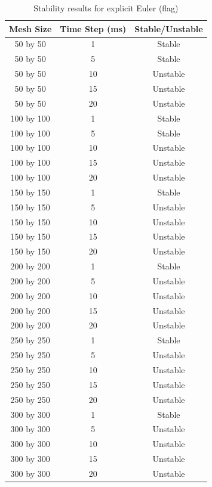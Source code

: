 \begin{table}[tp]
   \begin{minipage}{\textwidth}
      \begin{center}
         \begin{tabular}{c|c|c}
           Mesh Size & Time Step (ms) & Stable/Unstable\\
           \hline
           50 by 50 & 1 & Stable\\
           50 by 50 & 5 & Stable\\
           50 by 50 & 10 & Unstable\\
           50 by 50 & 15 & Unstable\\
           50 by 50 & 20 & Unstable\\
           100 by 100 & 1 & Stable\\
           100 by 100 & 5 & Stable\\
           100 by 100 & 10 & Unstable\\
           100 by 100 & 15 & Unstable\\
           100 by 100 & 20 & Unstable\\           
           150 by 150 & 1 & Stable\\
           150 by 150 & 5 & Unstable\\
           150 by 150 & 10 & Unstable\\
           150 by 150 & 15 & Unstable\\
           150 by 150 & 20 & Unstable\\           
           200 by 200 & 1 & Stable\\
           200 by 200 & 5 & Unstable\\
           200 by 200 & 10 & Unstable\\
           200 by 200 & 15 & Unstable\\
           200 by 200 & 20 & Unstable\\           
           250 by 250 & 1 & Stable\\
           250 by 250 & 5 & Unstable\\
           250 by 250 & 10 & Unstable\\
           250 by 250 & 15 & Unstable\\
           250 by 250 & 20 & Unstable\\           
           300 by 300 & 1 & Stable\\
           300 by 300 & 5 & Unstable\\
           300 by 300 & 10 & Unstable\\
           300 by 300 & 15 & Unstable\\
           300 by 300 & 20 & Unstable\\
         \end{tabular}
      \end{center}
   \end{minipage}
   \caption{Stability results for explicit Euler (flag)}
   \label{tab:ee stability flag}
\end{table}

